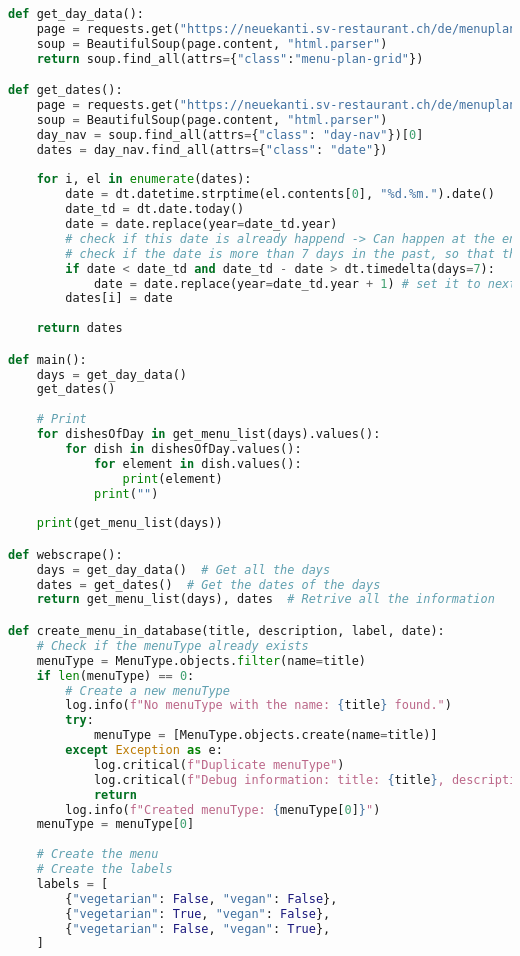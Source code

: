 \begin{lstlisting}[language=Python]
def get_day_data():
    page = requests.get("https://neuekanti.sv-restaurant.ch/de/menuplan/")
    soup = BeautifulSoup(page.content, "html.parser")
    return soup.find_all(attrs={"class":"menu-plan-grid"})

def get_dates():
    page = requests.get("https://neuekanti.sv-restaurant.ch/de/menuplan/")
    soup = BeautifulSoup(page.content, "html.parser")
    day_nav = soup.find_all(attrs={"class": "day-nav"})[0]
    dates = day_nav.find_all(attrs={"class": "date"})
    
    for i, el in enumerate(dates):
        date = dt.datetime.strptime(el.contents[0], "%d.%m.").date()
        date_td = dt.date.today()
        date = date.replace(year=date_td.year)
        # check if this date is already happend -> Can happen at the end of the year
        # check if the date is more than 7 days in the past, so that this won't be triggered when the mensa page is not updated correctly.
        if date < date_td and date_td - date > dt.timedelta(days=7):
            date = date.replace(year=date_td.year + 1) # set it to next year
        dates[i] = date
    
    return dates

def main():
    days = get_day_data()
    get_dates()
    
    # Print
    for dishesOfDay in get_menu_list(days).values():
        for dish in dishesOfDay.values():
            for element in dish.values():
                print(element)
            print("")
    
    print(get_menu_list(days))

def webscrape():
    days = get_day_data()  # Get all the days
    dates = get_dates()  # Get the dates of the days
    return get_menu_list(days), dates  # Retrive all the information

def create_menu_in_database(title, description, label, date):
    # Check if the menuType already exists
    menuType = MenuType.objects.filter(name=title)
    if len(menuType) == 0:
        # Create a new menuType
        log.info(f"No menuType with the name: {title} found.")
        try:
            menuType = [MenuType.objects.create(name=title)]
        except Exception as e:
            log.critical(f"Duplicate menuType")
            log.critical(f"Debug information: title: {title}, description: {description}, label: {label}, date: {date}, menuType: {menuType}")
            return
        log.info(f"Created menuType: {menuType[0]}")
    menuType = menuType[0]
    
    # Create the menu
    # Create the labels
    labels = [
        {"vegetarian": False, "vegan": False},
        {"vegetarian": True, "vegan": False},
        {"vegetarian": False, "vegan": True},
    ]
    

\end{lstlisting}
